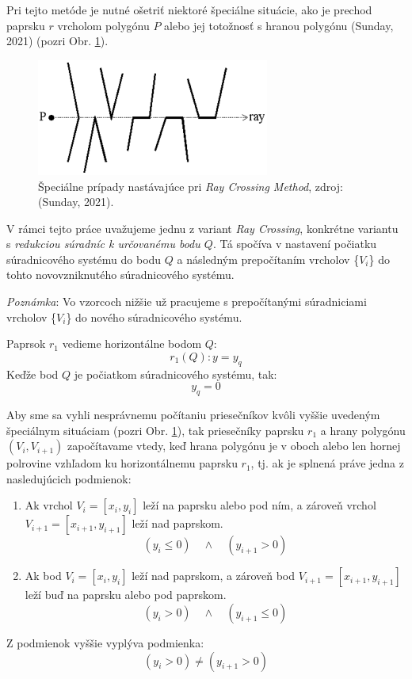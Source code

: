 \documentclass[11pt]{article}
\begin{document}
Pri tejto metóde je nutné ošetriť niektoré špeciálne situácie, ako je prechod paprsku $r$ vrcholom polygónu $P$ alebo jej totožnosť s hranou polygónu (Sunday, 2021) (pozri Obr. \ref{fig:obr3}).
\newpage
\begin{figure}[h]
    \includegraphics[width=7.65cm, height=3.84cm]{obr4.png}
    \centering
    \caption{Špeciálne prípady nastávajúce pri \textit{Ray Crossing Method}, zdroj: (Sunday, 2021).}
    \label{fig:obr3}
\end{figure}

V rámci tejto práce uvažujeme jednu z variant \textit{Ray Crossing}, konkrétne variantu s \textit{redukciou súradníc k určovanému bodu $Q$}. Tá spočíva v nastavení počiatku súradnicového systému do bodu $Q$ a následným prepočítaním vrcholov \{$V_i$\} do tohto novovzniknutého súradnicového systému.

\noindent \textit{Poznámka}: Vo vzorcoch nižšie už pracujeme s prepočítanými súradniciami vrcholov \{$V_i$\} do nového súradnicového systému.

\noindent Paprsok $r_1$ vedieme horizontálne bodom $Q$:
\begin{equation*}
r_1(Q) : y=y_q
\end{equation*}
Keďže bod $Q$ je počiatkom súradnicového systému, tak:
\begin{equation*}
y_q=0
\end{equation*}

Aby sme sa vyhli nesprávnemu počítaniu priesečníkov kvôli vyššie uvedeným špeciálnym situáciam (pozri Obr. \ref{fig:obr3}), tak priesečníky paprsku $r_1$ a hrany polygónu $(V_i, V_{i+1})$ započítavame vtedy, keď hrana polygónu je v oboch alebo len hornej polrovine vzhľadom ku horizontálnemu paprsku $r_1$, tj. ak je splnená práve jedna z nasledujúcich podmienok:
\begin{enumerate}[label=(\alph*),,leftmargin=1.59\parindent]
    \item Ak vrchol $V_i=[x_i,y_i]$ leží na paprsku alebo pod ním, a zároveň vrchol $V_{i+1}=[x_{i+1},y_{i+1}]$ leží nad paprskom.
    \begin{equation*}
    (y_i\leq0) \quad \wedge \quad (y_{i+1}>0)
    \end{equation*}
    \item Ak bod $V_i=[x_i,y_i]$ leží nad paprskom, a zároveň bod $V_{i+1}=[x_{i+1},y_{i+1}]$ leží buď na paprsku alebo pod paprskom. 
    \begin{equation*}
    (y_i>0) \quad \wedge \quad (y_{i+1}\leq0)
    \end{equation*}
\end{enumerate}
Z podmienok vyššie vyplýva podmienka:
\begin{equation*}
(y_i>0) \neq (y_{i+1}>0)
\end{equation*}
\end{document}
